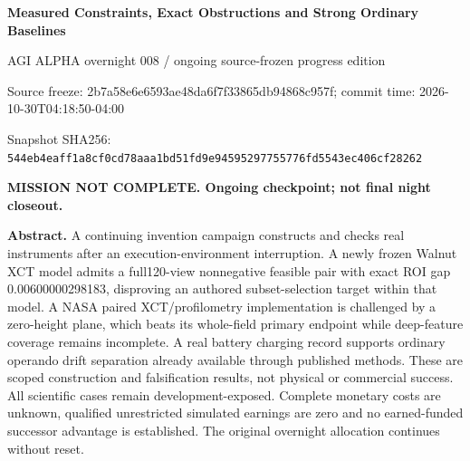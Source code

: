 \documentclass[11pt,letterpaper]{article}
\begin{document}
{\LARGE\bfseries Measured Constraints, Exact Obstructions and Strong Ordinary Baselines}\par
{\large AGI ALPHA overnight 008 / ongoing source-frozen progress edition}\par
\small Source freeze: 2b7a58e6e6593ae48da6f7f33865db94868c957f; commit time: 2026-10-30T04:18:50-04:00\par
\footnotesize Snapshot SHA256: \texttt{544eb4eaff1a8cf0cd78aaa1bd51fd9e94595297755776fd5543ec406cf28262}\par\normalsize
\textbf{MISSION NOT COMPLETE. Ongoing checkpoint; not final night closeout.}\par
\textbf{Abstract.} A continuing invention campaign constructs and checks real instruments after an execution-environment interruption. A newly frozen Walnut XCT model admits a full120-view nonnegative feasible pair with exact ROI gap 0.00600000298183, disproving an authored subset-selection target within that model. A NASA paired XCT/profilometry implementation is challenged by a zero-height plane, which beats its whole-field primary endpoint while deep-feature coverage remains incomplete. A real battery charging record supports ordinary operando drift separation already available through published methods. These are scoped construction and falsification results, not physical or commercial success. All scientific cases remain development-exposed. Complete monetary costs are unknown, qualified unrestricted simulated earnings are zero and no earned-funded successor advantage is established. The original overnight allocation continues without reset.\par
\end{document}
